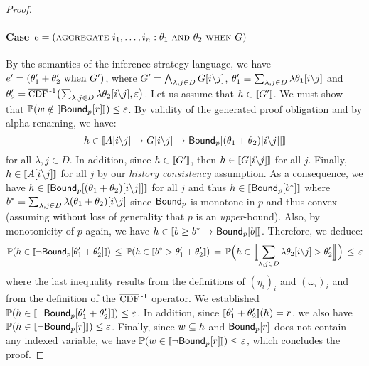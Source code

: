\documentclass[acmsmall,screen,nonacm]{acmart}
\begin{document}
\begin{proof}
  \paragraph{Case $e = (\operatorname{\textsc{aggregate}\,} i_1, \dots, i_n: \theta_1 \operatorname*{\,\textsc{and}\,} \theta_2  \operatorname*{\,\textsc{when}\,} G)$} By the semantics of the inference strategy language, we have $e' = (\theta_1' + \theta_2' \operatorname{\,\text{when}\,} G')$, where $G' = \bigwedge_{\lambda, j \in D} {G}[i \backslash j]$, $\theta_1' \equiv \sum_{\lambda, j \in D} {\lambda {\theta_1}[i \backslash j]}$ and $\theta_2' = \InvCCDF\bigl(\sum_{\lambda, j \in D} {\lambda \FSubst{\theta_2}{i}{j}}, \Eps \bigl)$. Let us assume that $\historyEnv \in \sem{G'}$. We must show that $\Prob(\latestEnv \notin \sem{\BoundWith{p}{r}}) \le \Eps$. By validity of the generated proof obligation and by alpha-renaming, we have: \[h \in \sem{\FSubst{A}{i}{j} \limplyI \FSubst{G}{i}{j} \limplyI \BoundWith{p}{\FSubst{(\theta_1+\theta_2)}{i}{j}}}\]
  for all $\lambda,j \in D$. In addition, since $\historyEnv \in \sem{G'}$, then $\historyEnv \in \sem{\FSubst{G}{i}{j}}$ for all $j$. Finally, $\historyEnv \in \sem{\FSubst{A}{i}{j}}$ for all $j$ by our \emph{history consistency} assumption. As a consequence, we have $h \in \sem{\BoundWith{p}{\FSubst{(\theta_1+\theta_2)}{i}{j}}}$ for all $j$ and thus $h \in \sem{\BoundWith{p}{b^*}}$ where $b^* \equiv \sum_{\lambda, j \in D} \lambda {(\theta_1 + \theta_2)}[i \backslash j]$ since $\mathsf{Bound}_p$ is monotone in $p$ and thus convex (assuming without loss of generality that $p$ is an \emph{upper}-bound). Also, by monotonicity of $p$ again, we have $\historyEnv \in \sem{b \ge b^* \limplyI \BoundWith{p}{b}}$. Therefore, we deduce:
  \[ \Prob(\historyEnv \in \sem{\neg\BoundWith{p}{\theta_1'+\theta_2'}}) \,\le\, \Prob(h \in \sem{b^* > \theta_1' + \theta_2'}) \,=\, \Prob\Bigl(h \in \bigsem{\sum_{\lambda, j \in D} {\lambda \FSubst{\theta_2}{i}{j}} > \theta_2'}\Bigr) \,\le\, \Eps \] where the last inequality results from the definitions of $(\eta_i)_i$ and $(\omega_i)_i$ and from the definition of the $\InvCCDF$ operator.
  We established $\Prob(\historyEnv \in \sem{\neg\BoundWith{p}{\theta_1'+\theta_2'}}) \le \Eps$. In addition, since $\sem{\theta_1' + \theta_2'}(\historyEnv) = r$, we also have $\Prob(\historyEnv \in \sem{\neg\BoundWith{p}{r}}) \le \Eps$. Finally, since $w \subseteq h$ and $\mathsf{Bound}_{p}[r]$ does not contain any indexed variable, we have $\Prob(\latestEnv \in \sem{\neg\BoundWith{p}{r}}) \le \Eps$, which concludes the proof.
\end{proof}
\end{document}

